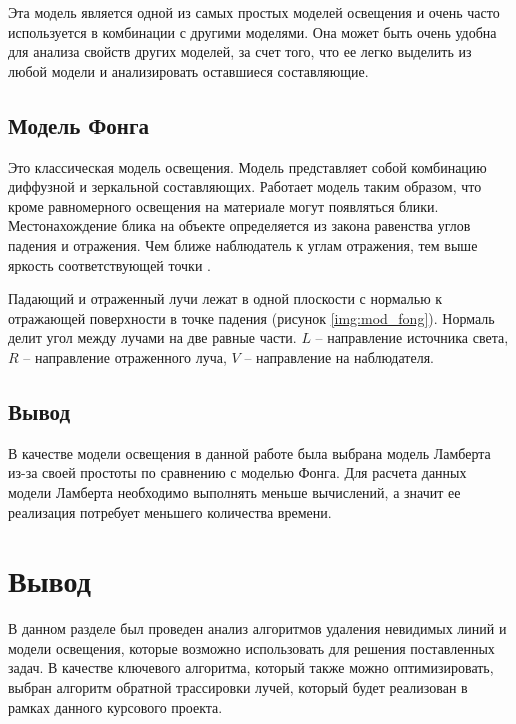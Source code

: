 
Эта модель является одной из самых простых моделей освещения и очень часто используется в комбинации с другими моделями. Она может быть очень удобна для анализа свойств других моделей, за счет того, что ее легко выделить из любой модели и анализировать оставшиеся составляющие.

\subsection{Модель Фонга}

Это классическая модель освещения. Модель представляет собой комбинацию диффузной и зеркальной составляющих. Работает модель таким образом, что кроме равномерного освещения на материале могут появляться блики. Местонахождение блика на объекте определяется из закона равенства углов падения и отражения. Чем ближе наблюдатель к углам отражения, тем выше яркость соответствующей точки \cite{lamber_fong}.


Падающий и отраженный лучи лежат в одной плоскости с нормалью к отражающей поверхности в точке падения (рисунок \ref{img:mod_fong}). Нормаль делит угол между лучами на две равные части. $L$ – направление источника света, $R$ – направление отраженного луча, $V$ – направление на наблюдателя.

\subsection{Вывод}
В качестве модели освещения в данной работе была выбрана модель Ламберта из-за своей простоты по сравнению с моделью Фонга. Для расчета данных модели Ламберта необходимо выполнять меньше вычислений, а значит ее реализация потребует меньшего количества времени.

\section{Вывод}
В данном разделе был проведен анализ алгоритмов удаления невидимых линий и модели освещения, которые возможно использовать для решения поставленных задач. В качестве ключевого алгоритма, который также можно оптимизировать, выбран алгоритм обратной трассировки лучей, который будет реализован в рамках данного курсового проекта.

